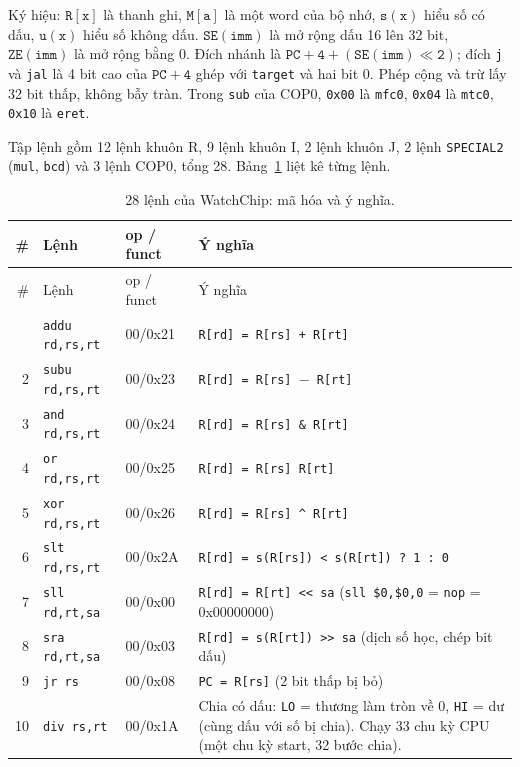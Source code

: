 Ký hiệu: $\mathtt{R[x]}$ là thanh ghi, $\mathtt{M[a]}$ là một word của bộ nhớ, $\mathtt{s(x)}$ hiểu số có dấu, $\mathtt{u(x)}$ hiểu số không dấu. $\mathtt{SE(imm)}$ là mở rộng dấu 16 lên 32 bit, $\mathtt{ZE(imm)}$ là mở rộng bằng 0. Đích nhánh là $\mathtt{PC + 4 + (SE(imm) \ll 2)}$; đích \texttt{j} và \texttt{jal} là 4 bit cao của $\mathtt{PC + 4}$ ghép với \texttt{target} và hai bit 0. Phép cộng và trừ lấy 32 bit thấp, không bẫy tràn. Trong \texttt{sub} của COP0, \texttt{0x00} là \texttt{mfc0}, \texttt{0x04} là \texttt{mtc0}, \texttt{0x10} là \texttt{eret}.

Tập lệnh gồm 12 lệnh khuôn R, 9 lệnh khuôn I, 2 lệnh khuôn J, 2 lệnh \texttt{SPECIAL2} (\texttt{mul}, \texttt{bcd}) và 3 lệnh COP0, tổng 28. Bảng~\ref{tab:isa28} liệt kê từng lệnh.

{\small
\begin{longtable}{@{}r p{3.6cm} l p{6.1cm}@{}}
\caption{28 lệnh của WatchChip: mã hóa và ý nghĩa.}\label{tab:isa28}\\
\toprule
\# & Lệnh & op / funct & Ý nghĩa \\
\midrule
\endfirsthead
\toprule
\# & Lệnh & op / funct & Ý nghĩa \\
\midrule
\endhead
\bottomrule
\endfoot
1 & \texttt{addu rd,rs,rt} & 00/0x21 & \texttt{R[rd] = R[rs] + R[rt]} \\
2 & \texttt{subu rd,rs,rt} & 00/0x23 & \texttt{R[rd] = R[rs] $-$ R[rt]} \\
3 & \texttt{and rd,rs,rt} & 00/0x24 & \texttt{R[rd] = R[rs] \& R[rt]} \\
4 & \texttt{or rd,rs,rt} & 00/0x25 & \texttt{R[rd] = R[rs] \textbar{} R[rt]} \\
5 & \texttt{xor rd,rs,rt} & 00/0x26 & \texttt{R[rd] = R[rs] \^{} R[rt]} \\
6 & \texttt{slt rd,rs,rt} & 00/0x2A & \texttt{R[rd] = s(R[rs]) < s(R[rt]) ? 1 : 0} \\
7 & \texttt{sll rd,rt,sa} & 00/0x00 & \texttt{R[rd] = R[rt] {<}{<} sa} (\texttt{sll \$0,\$0,0} = \texttt{nop} = 0x00000000) \\
8 & \texttt{sra rd,rt,sa} & 00/0x03 & \texttt{R[rd] = s(R[rt]) {>}{>} sa} (dịch số học, chép bit dấu) \\
9 & \texttt{jr rs} & 00/0x08 & \texttt{PC = R[rs]} (2 bit thấp bị bỏ) \\
10 & \texttt{div rs,rt} & 00/0x1A & Chia có dấu: \texttt{LO} = thương làm tròn về 0, \texttt{HI} = dư (cùng dấu với số bị chia). Chạy 33 chu kỳ CPU (một chu kỳ start, 32 bước chia). \\

\end{longtable}}
